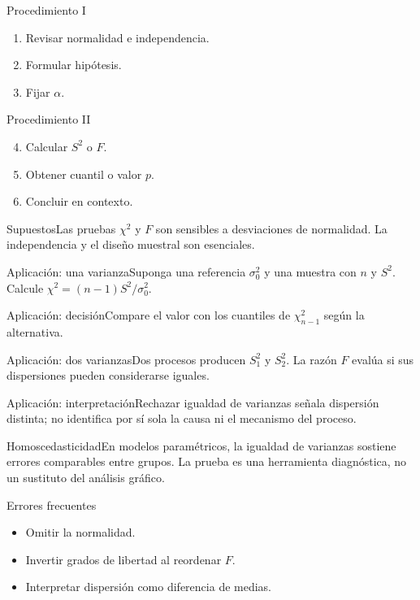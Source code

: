 \documentclass[10pt,aspectratio=169]{beamer}
\begin{document}
\begin{frame}{Procedimiento I}\small\begin{enumerate}\item Revisar normalidad e independencia.\item Formular hipótesis.\item Fijar $\alpha$.\end{enumerate}\end{frame}
\begin{frame}{Procedimiento II}\small\begin{enumerate}\setcounter{enumi}{3}\item Calcular $S^2$ o $F$.\item Obtener cuantil o valor $p$.\item Concluir en contexto.\end{enumerate}\end{frame}
\begin{frame}{Supuestos}\small Las pruebas $\chi^2$ y $F$ son sensibles a desviaciones de normalidad. La independencia y el diseño muestral son esenciales.\end{frame}
\begin{frame}{Aplicación: una varianza}\small Suponga una referencia $\sigma_0^2$ y una muestra con $n$ y $S^2$. Calcule $\chi^2=(n-1)S^2/\sigma_0^2$.\end{frame}
\begin{frame}{Aplicación: decisión}\small Compare el valor con los cuantiles de $\chi^2_{n-1}$ según la alternativa.\end{frame}
\begin{frame}{Aplicación: dos varianzas}\small Dos procesos producen $S_1^2$ y $S_2^2$. La razón $F$ evalúa si sus dispersiones pueden considerarse iguales.\end{frame}
\begin{frame}{Aplicación: interpretación}\small Rechazar igualdad de varianzas señala dispersión distinta; no identifica por sí sola la causa ni el mecanismo del proceso.\end{frame}
\begin{frame}{Homoscedasticidad}\small En modelos paramétricos, la igualdad de varianzas sostiene errores comparables entre grupos. La prueba es una herramienta diagnóstica, no un sustituto del análisis gráfico.\end{frame}
\begin{frame}{Errores frecuentes}\small\begin{itemize}\item Omitir la normalidad.\item Invertir grados de libertad al reordenar $F$.\item Interpretar dispersión como diferencia de medias.\end{itemize}\end{frame}
\end{document}
